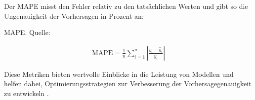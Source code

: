 Der MAPE misst den Fehler relativ zu den tatsächlichen Werten und gibt so die Ungenauigkeit der Vorhersagen in Prozent an:

\begin{formel}[h]
	\caption{\ac{MAPE}. Quelle: \autocite{myttenaere2016mape}}
	\label{frm:MAPE}
	\begin{align}
	\text{MAPE} = \frac{1}{n} \sum_{i=1}^{n} \left| \frac{y_i - \hat{y}_i}{y_i} \right|
	\end{align}
\end{formel}

Diese Metriken bieten wertvolle Einblicke in die Leistung von Modellen und helfen dabei, Optimierungsstrategien zur Verbesserung der Vorhersagegenauigkeit zu entwickeln \autocite{hyndman2006another}\autocite{makridakis1993accuracy}.





